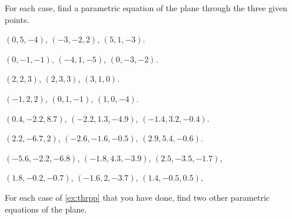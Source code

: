 \begin{exercise} \label{ex:thrpp} 
For each case, find a parametric equation of the plane through the three given points.
\begin{parts}
\item 
\((0,5,-4)\),
\((-3,-2,2)\),
\((5,1,-3)\).

\item
\((0,-1,-1)\),
\((-4,1,-5)\),
\((0,-3,-2)\).

\item 
\((2,2,3)\),
\((2,3,3)\),
\((3,1,0)\).

\item
\((-1,2,2)\),
\((0,1,-1)\),
\((1,0,-4)\).

\item
\((0.4,-2.2,8.7)\),
\((-2.2,1.3,-4.9)\),
\((-1.4,3.2,-0.4)\).

\item
\((2.2,-6.7,2)\),
\((-2.6,-1.6,-0.5)\),
\((2.9,5.4,-0.6)\).

\item
\((-5.6,-2.2,-6.8)\),
\((-1.8,4.3,-3.9)\),
\((2.5,-3.5,-1.7)\),

\item
\((1.8,-0.2,-0.7)\),
\((-1.6,2,-3.7)\),
\((1.4,-0.5,0.5)\),

\end{parts}
\end{exercise}


\begin{exercise} \label{ex:} 
For each case of \autoref{ex:thrpp} that you have done, find two other parametric equations of the plane.
\end{exercise}





\begin{comment}%
why, what caused X?
how did X occur?
what-if? what-if-not?
how does X compare with Y?
what is the evidence for X?
why is X important?
\end{comment}




